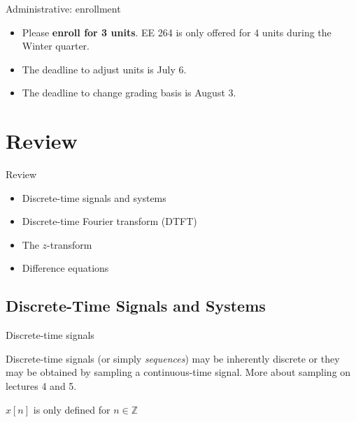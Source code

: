 \documentclass[10pt, aspectratio=169]{beamer}
\begin{document}
%
\begin{frame}{Administrative: enrollment}
	
\begin{itemize}
	\item Please \textbf{enroll for 3 units}. EE 264 is only offered for 4 units during the Winter quarter.
	\item The deadline to adjust units is July 6.
	\item The deadline to change grading basis is August 3.
\end{itemize}
	
\end{frame}

\section{Review}

%
\begin{frame}{Review}
	\begin{itemize}
		\item Discrete-time signals and systems
		\item Discrete-time Fourier transform (DTFT)
		\item The $z$-transform
		\item Difference equations
	\end{itemize}
\end{frame}

\subsection{Discrete-Time Signals and Systems}
%
\begin{frame}{Discrete-time signals}

Discrete-time signals (or simply \textit{sequences}) may be inherently discrete or they may be obtained by sampling a continuous-time signal. More about sampling on lectures 4 and 5.

\begin{figure}[t!]
	\centering
	\resizebox{0.4\linewidth}{!}{}
	\label{fig:ct_signal_sampled}
\end{figure}

$x[n]$ is only defined for $n\in\mathbb{Z}$
\end{frame}
\end{document}
